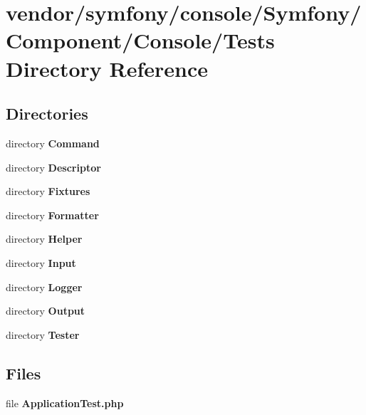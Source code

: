 \section{vendor/symfony/console/\+Symfony/\+Component/\+Console/\+Tests Directory Reference}
\label{dir_49293a4af019769eea9f890ddc3be07c}
\subsection*{Directories}
\begin{DoxyCompactItemize}
\item 
directory {\bf Command}
\item 
directory {\bf Descriptor}
\item 
directory {\bf Fixtures}
\item 
directory {\bf Formatter}
\item 
directory {\bf Helper}
\item 
directory {\bf Input}
\item 
directory {\bf Logger}
\item 
directory {\bf Output}
\item 
directory {\bf Tester}
\end{DoxyCompactItemize}
\subsection*{Files}
\begin{DoxyCompactItemize}
\item 
file {\bf Application\+Test.\+php}
\end{DoxyCompactItemize}
